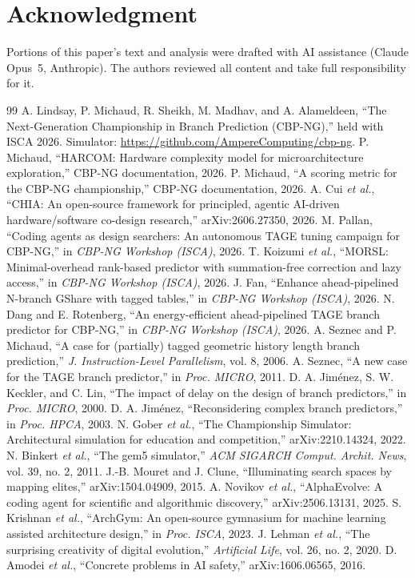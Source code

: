 \documentclass[conference]{IEEEtran}
\begin{document}
\section*{Acknowledgment}
Portions of this paper's text and analysis were drafted with AI assistance
(Claude Opus~5, Anthropic). The authors reviewed all content and take full
responsibility for it.

\balance
\begin{thebibliography}{99}
 A. Lindsay, P. Michaud, R. Sheikh, M. Madhav, and A. Alameldeen,
``The Next-Generation Championship in Branch Prediction (CBP-NG),'' held with
ISCA 2026. Simulator: \url{https://github.com/AmpereComputing/cbp-ng}.
 P. Michaud, ``HARCOM: Hardware complexity model for
microarchitecture exploration,'' CBP-NG documentation, 2026.
 P. Michaud, ``A scoring metric for the CBP-NG
championship,'' CBP-NG documentation, 2026.
 A. Cui \emph{et al.}, ``CHIA: An open-source framework for
principled, agentic AI-driven hardware/software co-design research,''
arXiv:2606.27350, 2026.
 M. Pallan, ``Coding agents as design searchers: An autonomous
TAGE tuning campaign for CBP-NG,'' in \emph{CBP-NG Workshop (ISCA)}, 2026.
 T. Koizumi \emph{et al.}, ``MORSL: Minimal-overhead
rank-based predictor with summation-free correction and lazy access,'' in
\emph{CBP-NG Workshop (ISCA)}, 2026.
 J. Fan, ``Enhance ahead-pipelined N-branch GShare with tagged
tables,'' in \emph{CBP-NG Workshop (ISCA)}, 2026.
 N. Dang and E. Rotenberg, ``An energy-efficient ahead-pipelined
TAGE branch predictor for CBP-NG,'' in \emph{CBP-NG Workshop (ISCA)}, 2026.
 A. Seznec and P. Michaud, ``A case for (partially)
tagged geometric history length branch prediction,'' \emph{J. Instruction-Level
Parallelism}, vol. 8, 2006.
 A. Seznec, ``A new case for the TAGE branch
predictor,'' in \emph{Proc. MICRO}, 2011.
 D. A. Jim\'enez, S. W. Keckler, and C. Lin, ``The
impact of delay on the design of branch predictors,'' in \emph{Proc. MICRO},
2000.
 D. A. Jim\'enez, ``Reconsidering complex
branch predictors,'' in \emph{Proc. HPCA}, 2003.
 N. Gober \emph{et al.}, ``The Championship Simulator:
Architectural simulation for education and competition,'' arXiv:2210.14324, 2022.
 N. Binkert \emph{et al.}, ``The gem5 simulator,''
\emph{ACM SIGARCH Comput. Archit. News}, vol. 39, no. 2, 2011.
 J.-B. Mouret and J. Clune, ``Illuminating
search spaces by mapping elites,'' arXiv:1504.04909, 2015.
 A. Novikov \emph{et al.}, ``AlphaEvolve: A coding agent
for scientific and algorithmic discovery,'' arXiv:2506.13131, 2025.
 S. Krishnan \emph{et al.}, ``ArchGym: An open-source
gymnasium for machine learning assisted architecture design,'' in \emph{Proc.
ISCA}, 2023.
 J. Lehman \emph{et al.}, ``The surprising
creativity of digital evolution,'' \emph{Artificial Life}, vol. 26, no. 2, 2020.
 D. Amodei \emph{et al.}, ``Concrete problems in
AI safety,'' arXiv:1606.06565, 2016.
\end{thebibliography}
\end{document}
